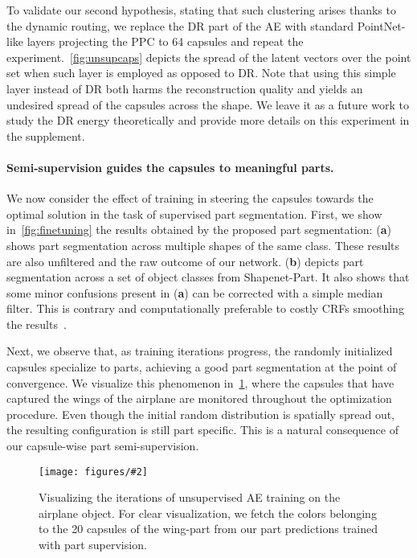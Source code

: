 \documentclass[10pt,twocolumn,letterpaper]{article}
\theoremstyle{break}
\newcommand{\insertimageC}[5]{ \begin{figure}[#5]
\centering
\texttt{[image: figures/\#2]}
\caption{#3}
\label{#4}
\end{figure}
}
\begin{document}
To validate our second hypothesis, stating that such clustering arises thanks to the dynamic routing, we replace the DR part of the AE with standard PointNet-like layers projecting the  PPC to 64 capsules and repeat the experiment.~\cref{fig:unsupcaps} depicts the spread of the latent vectors over the point set when such layer is employed as opposed to DR. Note that using this simple layer instead of DR both harms the reconstruction quality and yields an undesired spread of the capsules across the shape. We leave it as a future work to study the DR energy theoretically and provide more details on this experiment in the supplement.








\vspace{-3mm}
\paragraph{Semi-supervision guides the capsules to meaningful parts.}
We now consider the effect of training in steering the capsules towards the optimal solution in the task of supervised part segmentation. First, we show in~\cref{fig:finetuning} the results obtained by the proposed part segmentation: (\textbf{a}) shows part segmentation across multiple shapes of the same class. These results are also unfiltered and the raw outcome of our network. (\textbf{b}) depicts part segmentation across a set of object classes from Shapenet-Part. It also shows that some minor confusions present in (\textbf{a}) can be corrected with a simple median filter. This is contrary and computationally preferable to costly CRFs smoothing the results~\cite{wang2017cnn}. 

Next, we observe that, as training iterations progress, the randomly initialized capsules specialize to parts, achieving a good part segmentation at the point of convergence. We visualize this phenomenon in~\cref{fig:evolution}, where the capsules that have captured the wings of the airplane are monitored throughout the optimization procedure. Even though the initial random distribution is spatially spread out, the resulting configuration is still part specific. This is a natural consequence of our capsule-wise part semi-supervision. 

\insertimageC{1}{model_evolution.pdf}{Visualizing the iterations of unsupervised AE training on the airplane object. For clear visualization, we fetch the colors belonging to the 20 capsules of the wing-part from our part predictions trained with part supervision.\vspace{-3mm}}{fig:evolution}{t!}
\vspace{-2mm}
\end{document}
